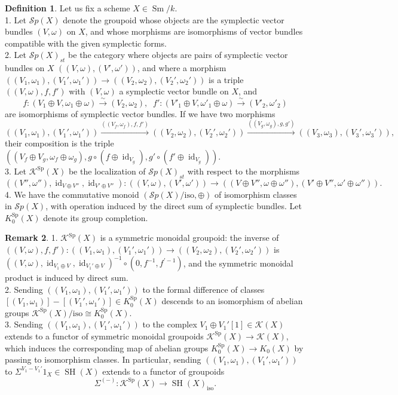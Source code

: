 \documentclass[10pt]{amsart}
\theoremstyle{definition}
\newtheorem{defn}{Definition}[section]
\newtheorem{rmk}[defn]{Remark}
\theoremstyle{plain}
\numberwithin{equation}{section}
\newcommand{\0}{\emptyset}
\newcommand{\sK}{{\mathcal K}}
\newcommand{\sS}{{\mathcal S}}
\newcommand{\Sp}{{\operatorname{Sp}}}
\newcommand{\SH}{{\operatorname{SH}}}
\newcommand{\Sm}{{\operatorname{Sm}}}
\newcommand{\id}{{\operatorname{id}}}
\begin{document}
\begin{defn} Let us fix a scheme $X\in \Sm/k$.\\[5pt]
1. Let $\sS{p}(X)$ denote the groupoid whose objects are the symplectic vector bundles $(V,\omega)$ on $X$, and whose morphisms are isomorphisms of vector bundles compatible with the given symplectic forms.\\[2pt]
2. Let  $\sS{p}(X)_{st}$ be the category where objects are pairs of symplectic vector bundles on $X$ $((V,\omega), (V', \omega'))$, and where a morphism $((V_1,\omega_1), (V_1', \omega_1'))\to
((V_2,\omega_2), (V_2', \omega_2'))$ is a triple $((V,\omega), f,f')$ with $(V,\omega)$ a
symplectic vector bundle on $X$, and
$$f:(V_1\oplus V,\omega_1\oplus \omega)\xrightarrow{\sim} (V_2,\omega_2), \; \; f':(V'_1\oplus V,\omega'_1\oplus \omega)\xrightarrow{\sim} (V'_2,\omega'_2)$$ are isomorphisms of symplectic vector bundles. If we have two morphisms
$$((V_1,\omega_1),(V_1',\omega_1'))\xrightarrow{((V_f,\omega_f),f,f')} ((V_2,\omega_2),(V_2',\omega_2')) \xrightarrow{((V_g,\omega_g),g,g')} ((V_3,\omega_3),(V_3',\omega_3')),$$
their composition is the triple $((V_f \oplus V_g,\omega_f \oplus \omega_g),g \circ (f\oplus \id_{V_g}), g' \circ (f' \oplus \id_{V_g}))$. \\ [2pt]
3. Let $\sK^\Sp(X)$ be the localization of $\sS{p}(X)_{st}$ with respect to the morphisms 
$$((V'',\omega''), \id_{V\oplus V''},\id_{V'\oplus V''}):((V,\omega), (V', \omega'))\to ((V\oplus V'',\omega\oplus \omega''), (V'\oplus V'', \omega'\oplus\omega'')).$$
4. We have the commutative monoid $(\sS{p}(X)/\text{iso},\oplus)$ of isomorphism classes in $\sS{p}(X)$, with operation induced by the direct sum of symplectic  bundles. Let $K_0^\Sp(X)$ denote its group completion.
\end{defn}

\begin{rmk} 1. $\sK^\Sp(X)$ is a symmetric monoidal groupoid: the inverse of $((V,\omega), f,f'):((V_1,\omega_1), (V_1', \omega_1'))\to
((V_2,\omega_2), (V_2', \omega_2'))$ is $((V,\omega), \id_{V_1 \oplus V},\id_{V_1'\oplus V})^{-1}\circ (0, f^{-1}, f^{\prime-1})$, and the symmetric monoidal product is induced by direct sum. \\[2pt]
2. Sending $((V_1,\omega_1), (V_1', \omega_1'))$ to the formal difference of classes $[(V_1,\omega_1)]- [(V_1', \omega_1')]\in K_0^\Sp(X)$ descends to an isomorphism of abelian groups $ \sK^\Sp(X)/\text{iso}\cong  K_0^\Sp(X)$. \\[2pt]
3. Sending $((V_1,\omega_1), (V_1', \omega_1'))$ to  the complex $V_1\oplus V_1'[1]\in \sK(X)$ extends to a functor of symmetric monoidal groupoids $\sK^\Sp(X)\to \sK(X)$, which induces the corresponding map of abelian groups $K_0^\Sp(X)\to K_0(X)$ by passing to isomorphism classes. In particular, sending $((V_1,\omega_1), (V_1', \omega_1'))$ to $\Sigma^{V_1-V_1'}1_X\in \SH(X)$ extends to a functor of groupoids
\[
\Sigma^{(-)}:\sK^\Sp(X)\to \SH(X)_{\text{iso}}.
\]
\end{rmk}
\end{document}
